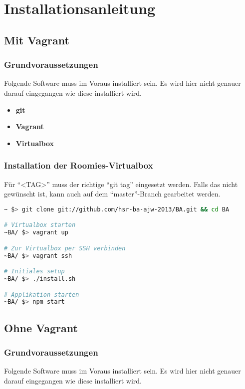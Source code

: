 \chapter{Installationsanleitung}

\section{Mit Vagrant}

\subsection*{Grundvoraussetzungen}
Folgende Software muss im Voraus installiert sein. Es wird hier nicht genauer
darauf eingegangen wie diese installiert wird.

\begin{itemize}
	\item \textbf{git} \cite{git}
	\item \textbf{Vagrant} \cite{Vagrant}
	\item \textbf{Virtualbox} \cite{Virtualbox}
\end{itemize}

\subsection*{Installation der Roomies-Virtualbox}
Für ``<TAG>'' muss der richtige ``git tag'' eingesetzt werden. Falls das nicht gewünscht ist, kann auch auf dem ``master''-Branch gearbeitet werden.

\begin{lstlisting}[language=Bash, caption=Installationsanleitung Vagrant]
~ $> git clone git://github.com/hsr-ba-ajw-2013/BA.git && cd BA

# Virtualbox starten
~BA/ $> vagrant up

# Zur Virtualbox per SSH verbinden
~BA/ $> vagrant ssh

# Initiales setup
~BA/ $> ./install.sh

# Applikation starten
~BA/ $> npm start
\end{lstlisting}

\section{Ohne Vagrant}

\subsection*{Grundvoraussetzungen}
Folgende Software muss im Voraus installiert sein. Es wird hier nicht genauer
darauf eingegangen wie diese installiert wird.

